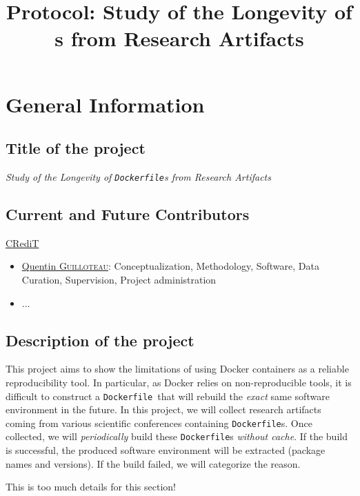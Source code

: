 \documentclass{article}
\title{Protocol: Study of the Longevity of \dfile s from Research Artifacts}
\newcommand{\dfile}{\texttt{Dockerfile}}
\begin{document}
\maketitle

\section{General Information}

\subsection{Title of the project}

\emph{Study of the Longevity of \dfile s from Research Artifacts}

\subsection{Current and Future Contributors}

\href{https://www.elsevier.com/researcher/author/policies-and-guidelines/credit-author-statement}{CRediT}

\begin{itemize}
  \item \href{https://orcid.org/0009-0003-7645-5044}{Quentin \textsc{Guilloteau}}: Conceptualization, Methodology, Software, Data Curation, Supervision, Project administration
  \item ...
\end{itemize}


\subsection{Description of the project}

This project aims to show the limitations of using Docker containers as a reliable reproducibility tool.
In particular, as Docker relies on non-reproducible tools, it is difficult to construct a \dfile\ that will rebuild the \emph{exact} same software environment in the future.
In this project, we will collect research artifacts coming from various scientific conferences containing \dfile s.
Once collected, we will \emph{periodically} build these \dfile s \emph{without cache}.
If the build is successful, the produced software environment will be extracted (package names and versions).
If the build failed, we will categorize the reason.


This is too much details for this section!
\end{document}
